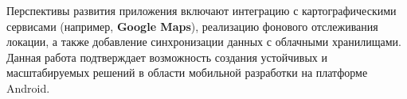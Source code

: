 Перспективы развития приложения включают интеграцию с картографическими сервисами (например, \textbf{Google Maps}), реализацию фонового отслеживания локации, а также добавление синхронизации данных с облачными хранилищами. Данная работа подтверждает возможность создания устойчивых и масштабируемых решений в области мобильной разработки на платформе Android.